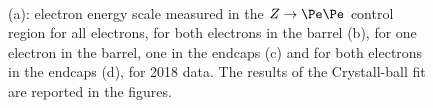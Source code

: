\begin{figure}[!htb]
\begin{center}
 \\
\end{center}
\caption{
(a): electron energy scale measured in the $Z\rightarrow \Pe \Pe$ control region for all electrons, for both electrons in the barrel (b), for one electron in the barrel, one in the endcaps (c) and for both electrons in the endcaps (d), for 2018 data.
The results of the Crystall-ball fit are reported in the figures. 
}
\label{fig:ele_energy_scaleC}
\end{figure}

\clearpage
